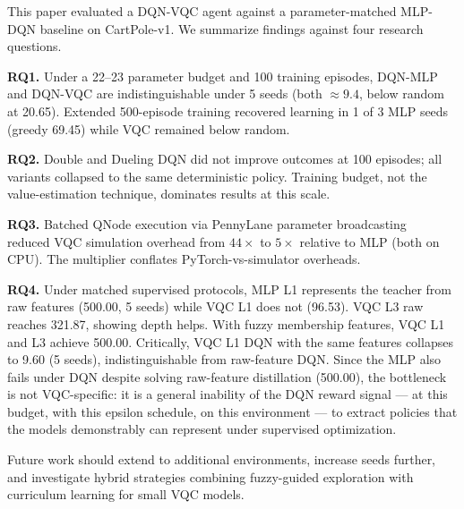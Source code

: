 This paper evaluated a DQN-VQC agent against a parameter-matched MLP-DQN
baseline on CartPole-v1. We summarize findings against four research questions.

\textbf{RQ1.} Under a 22--23 parameter budget and 100 training episodes,
DQN-MLP and DQN-VQC are indistinguishable under 5 seeds (both $\approx 9.4$,
below random at 20.65). Extended 500-episode training recovered learning in 1
of 3 MLP seeds (greedy 69.45) while VQC remained below random.

\textbf{RQ2.} Double and Dueling DQN did not improve outcomes at 100 episodes;
all variants collapsed to the same deterministic policy. Training budget, not
the value-estimation technique, dominates results at this scale.

\textbf{RQ3.} Batched QNode execution via PennyLane parameter
broadcasting~\cite{bergholm2018pennylane} reduced VQC simulation overhead from
$44\times$ to $5\times$ relative to MLP (both on CPU). The multiplier conflates
PyTorch-vs-simulator overheads.

\textbf{RQ4.} Under matched supervised protocols, MLP L1 represents the teacher
from raw features (500.00, 5 seeds) while VQC L1 does not (96.53). VQC L3 raw
reaches 321.87, showing depth helps. With fuzzy membership features, VQC L1 and
L3 achieve 500.00. Critically, VQC L1 DQN with the same features collapses to
9.60 (5 seeds), indistinguishable from raw-feature DQN. Since the MLP also fails
under DQN despite solving raw-feature distillation (500.00), the bottleneck
is not VQC-specific: it is a general inability of the DQN reward signal — at
this budget, with this epsilon schedule, on this environment — to extract
policies that the models demonstrably can represent under supervised
optimization.

Future work should extend to additional environments, increase seeds further,
and investigate hybrid strategies combining fuzzy-guided exploration with
curriculum learning for small VQC models.
